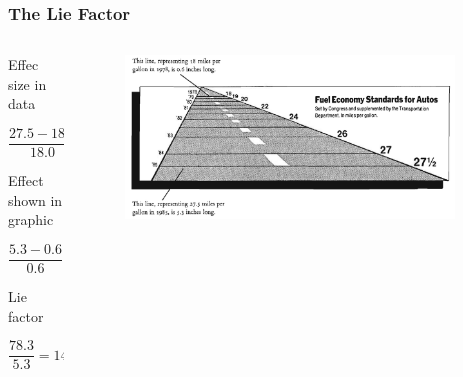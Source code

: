 \documentclass[aspectratio=1610]{beamer}
\begin{document}
\begin{frame}
	\frametitle{The Lie Factor}
	\begin{columns}
		\begin{column}{0.5\textwidth}
			\footnotesize
			Effec size in data

			\begin{equation}
				\frac{27.5 - 18.0}{18.0} = 5.3
			\end{equation}

			\vspace{1em}

			Effect shown in graphic

			\begin{equation}
				\frac{5.3 - 0.6}{0.6} = 78.3
			\end{equation}

			\vspace{1em}

			Lie factor

			\begin{equation}
				\frac{78.3}{5.3} = 14.8
			\end{equation}
		\end{column}
		\begin{column}{0.5\textwidth}
			\begin{figure}
				\begin{small}
					\begin{center}
						\includegraphics[width=0.95\textwidth]{
							images/fuel_economy.png
						}
					\end{center}
				\end{small}
			\end{figure}
		\end{column}
	\end{columns}
\end{frame}
\end{document}
